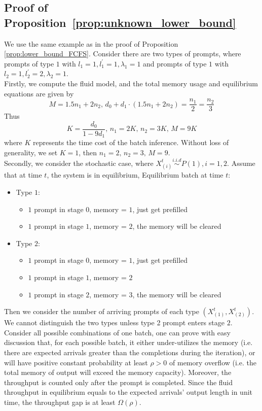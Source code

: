 \subsection{Proof of Proposition~\ref{prop:unknown_lower_bound}}\label{sec:proof_unknown_lower_bound}
We use the same example as in the proof of Proposition \ref{prop:lower_bound_FCFS}. Consider there are two types of prompts, where prompts of type $1$ with $l_1=1, l_1^\prime=1, \lambda_1=1$ and prompts of type $1$ with $l_2=1, l_2^\prime=2, \lambda_2=1$. \\
Firstly, we compute the fluid model, and the total memory usage and equilibrium equations are given by
$$M = 1.5n_1+2n_2,\, d_0+d_1\cdot (1.5n_1+2n_2) = \frac{n_1}{2}=\frac{n_2}{3}$$
Thus
$$K = \frac{d_0}{1-9d_1},\, n_1 = 2K,\, n_2=3K,\, M=9K$$
where $K$ represents the time cost of the batch inference. Without loss of generality, we set $K=1$, then $n_1=2, \,n_2=3,\,M=9 $. \\
Secondly, we consider the stochastic case, where $X_{(i)}^{t}\overset{i.i.d}{\sim} P(1), i=1,2$. Assume that at time $t$, the system is in equilibrium, Equilibrium batch at time $t$:
\begin{itemize}
    \item Type $1$:
    \begin{itemize}
        \itemsep0em
        \item $1$ prompt in stage $0$, memory = $1$, just get prefilled
        \item $1$ prompt in stage $1$, memory = $2$, the memory will be cleared
    \end{itemize}
    \item Type $2$:
    \begin{itemize}
        \itemsep0em
        \item $1$ prompt in stage $0$, memory = $1$, just get prefilled
        \item $1$ prompt in stage $1$, memory = $2$
        \item $1$ prompt in stage $2$, memory = $3$, the memory will be cleared
    \end{itemize}
\end{itemize}
Then we consider the number of arriving prompts of each type $(X_{(1)}^{t}, X_{(2)}^{t})$. We cannot distinguish the two types unless type 2 prompt enters stage $2$. Consider all possible combinations of one batch, one can prove with easy discussion that, for each possible batch, it either under-utilizes the memory (i.e. there are expected arrivals greater than the completions during the iteration), or will have positive constant probability at least $\rho>0$ of memory overflow (i.e. the total memory of output will exceed the memory capacity). Moreover, the throughput is counted only after the prompt is completed. Since the fluid throughput in equilibrium equals to the expected arrivals' output length in unit time, the throughput gap is at least $\Omega(\rho).$


